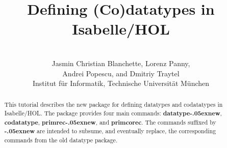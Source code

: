 \documentclass[12pt,a4paper]{article} %
\title{%
Defining (Co)datatypes in Isabelle/HOL}
\author{\hbox{} \\
Jasmin Christian Blanchette,
Lorenz Panny, \\
Andrei Popescu, and
Dmitriy Traytel \\
{\normalsize Institut f\"ur Informatik, Technische Universit\"at M\"unchen} \\
\hbox{}}
\renewcommand\_{\hbox{\textunderscore\kern-.05ex}}
\newcommand{\keyw}[1]{\textbf{#1}}
\begin{document}
\maketitle

\begin{abstract}
\noindent
This tutorial describes the new package for defining datatypes and codatatypes
in Isabelle/HOL. The package provides four main commands:
\keyw{datatype\_new}, \keyw{codatatype}, \keyw{primrec\_new},
and \keyw{primcorec}. The commands suffixed by
\keyw{\_new} are intended to subsume, and eventually replace, the corresponding
commands from the old datatype package.
\end{abstract}

\tableofcontents



\let\em=\sl
{}

\end{document}
